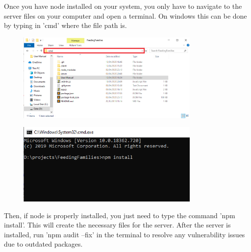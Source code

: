 \documentclass[12pt]{article}
\begin{document}
\noindent
Once you have node installed on your system, you only have to navigate to the server files on your computer and open a terminal. On windows this can be done by typing in 'cmd' where the file path is.
\begin{figure}[H]
    \centering
    \includegraphics[width=0.8\textwidth]{serversetup/files.png}
\end{figure}
\begin{figure}[H]
    \centering
    \includegraphics[width=0.8\textwidth]{serversetup/cmd.png}
\end{figure}
\noindent
Then, if node is properly installed, you just need to type the command 'npm install'. This will create the necessary files for the server. After the server is installed, run 'npm audit --fix' in the terminal to resolve any vulnerability issues due to outdated packages.\\
\end{document}
